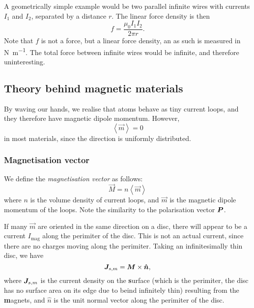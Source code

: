    A geometrically simple example would be two parallel infinite wires with currents $I_1$ and $I_2$, 
    separated by a distance $r$. The linear force density is then
    \begin{equation}
        f = \frac{\mu_0 I_1 I_2}{2\pi r}.
    \end{equation}
    Note that $f$ is not a force, but a linear force density, an as such is measured in \si{\newton\per\metre}. 
    The total force between infinite wires would be infinite, and therefore uninteresting.

\subsection{Theory behind magnetic materials}
    By waving our hands, we realise that atoms behave as tiny current loops, and they therefore have magnetic dipole momentum.
    However, 
    \begin{equation*}
        \left<\vec{m}\right> = 0
    \end{equation*}
    in most materials, since the direction is uniformly distributed. 

    \subsubsection{Magnetisation vector}
        We define the \textit{magnetisation vector} as follows:
        \begin{equation}
            \vec{M} = n\left<\vec{m}\right>
        \end{equation}
        where $n$ is the volume density of current loops, and $\vec{m}$ is the magnetic dipole momentum of the loops. 
        Note the similarity to the polarisation vector $\bm{P}$.

        If many $\vec{m}$ are oriented in the same direction on a disc, 
        there will appear to be a current $I_{\text{mag}}$ along the perimiter of the disc. 
        This is not an actual current, since there are no charges moving along the perimiter.
        Taking an infinitesimally thin disc, we have 
        \begin{equation}
            \j_{s, m} = \vec{M}\times\hat{n},
        \end{equation}
        where $\bm{J}_{s, m}$ is the current density on the \textbf{s}urface 
        (which is the perimiter, the disc has no surface area on its edge due to beind infinitely thin) 
        resulting from the \textbf{m}agnets, and $\hat{n}$ is the unit normal vector along the perimiter of the disc. 


